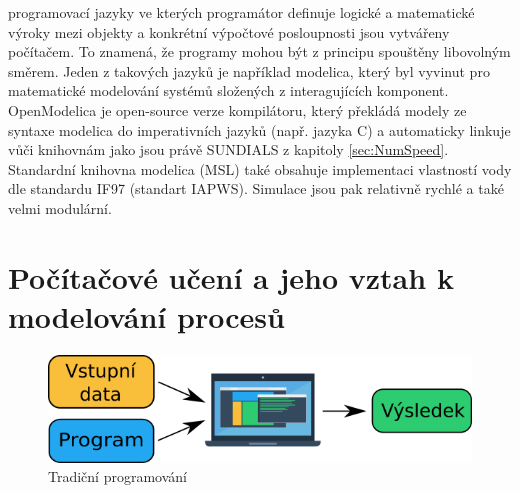 programovací jazyky ve kterých programátor definuje logické a matematické
výroky mezi objekty a konkrétní výpočtové posloupnosti jsou vytvářeny
počítačem. To znamená, že programy mohou být z principu spouštěny libovolným
směrem. Jeden z takových jazyků je například modelica, který byl vyvinut pro
matematické modelování systémů složených z interagujících komponent.
OpenModelica  je open-source verze kompilátoru, který překládá
modely ze syntaxe modelica do imperativních jazyků (např. jazyka C) a
automaticky linkuje vůči knihovnám jako jsou právě SUNDIALS z kapitoly
\ref{sec:NumSpeed}. Standardní knihovna modelica (MSL) také obsahuje
implementaci vlastností vody dle standardu IF97 (standart IAPWS). Simulace jsou
pak relativně rychlé a také velmi modulární.

\section{Počítačové učení a jeho vztah k modelování procesů}
\label{sec:ML}
\begin{figure}[h] \centering \capstart
  \includegraphics[scale=0.6]{figures/traditional_prog_cz}
  \caption{Tradiční programování}
  \label{fig:traditional_prog}
\end{figure}

